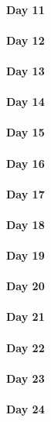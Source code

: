 \documentclass[UTF8,a4paper,8pt]{ctexart}
\begin{document}
 	 \paragraph{Day 11      \quad     }
 	 \paragraph{Day 12      \quad     }
 	 \paragraph{Day 13      \quad     }
 	 \paragraph{Day 14      \quad     }
 	 \paragraph{Day 15      \quad     }
 	 \paragraph{Day 16      \quad     }
 	 \paragraph{Day 17      \quad     }
 	 \paragraph{Day 18      \quad     }
 	 \paragraph{Day 19      \quad     }
 	 \paragraph{Day 20      \quad     }
 	 \paragraph{Day 21      \quad     }
 	 \paragraph{Day 22      \quad     }
 	 \paragraph{Day 23      \quad     }
 	 \paragraph{Day 24      \quad     }
\end{document}
